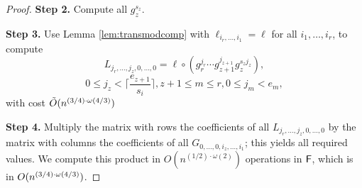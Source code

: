 \begin{proof}
\smallskip\noindent\textbf{Step 2.} Compute all $g_z^{s_z}$.

\smallskip\noindent\textbf{Step 3.} Use Lemma \ref{lem:transmodcomp}
with $\ell_{i_r,\dots,i_1} = \ell$ for all $i_1,\dots,i_r$, to compute 
$$L_{j_r,\dots,j_z, 0, \ldots,0} = \ell \circ (
g_{r}^{j_{r}}\cdots g_{z+1}^{j_{z+1}}g_{z}^{s_z j_z}),$$
$$
0 \leq j_{z} <  \Big\lceil \frac{e_{z+1}}{s_i} \Big\rceil , z+1\leq m \leq r, 0 \leq j_m < e_m,$$
with cost $\tilde{O}(n^{(3/4)\cdot \omega(4/3)})$

\smallskip\noindent\textbf{Step 4.} Multiply the matrix with rows the
coefficients of all $L_{j_r,\dots,j_z, 0, \ldots, 0}$ by the matrix with columns the
coefficients of all $G_{0, \ldots, 0,i_z,\dots,i_1}$; this yields all required
values. We compute this product in $O(n^{(1/2)\cdot\omega(2)})$
operations in ${\mathsf{F}}$, which is in $O(n^{(3/4)\cdot \omega(4/3)})$.
\end{proof}


